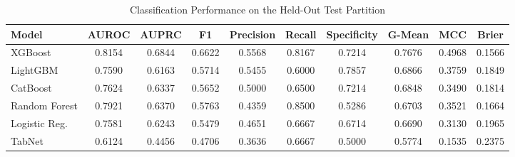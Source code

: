 \begin{table}
\centering
\caption{Classification Performance on the Held-Out Test Partition}
\label{tab:results}
\begin{tabular}{lccccccccc}
\toprule
Model & AUROC & AUPRC & F1 & Precision & Recall & Specificity & G-Mean & MCC & Brier \\
\midrule
XGBoost & 0.8154 & 0.6844 & 0.6622 & 0.5568 & 0.8167 & 0.7214 & 0.7676 & 0.4968 & 0.1566 \\
LightGBM & 0.7590 & 0.6163 & 0.5714 & 0.5455 & 0.6000 & 0.7857 & 0.6866 & 0.3759 & 0.1849 \\
CatBoost & 0.7624 & 0.6337 & 0.5652 & 0.5000 & 0.6500 & 0.7214 & 0.6848 & 0.3490 & 0.1814 \\
Random Forest & 0.7921 & 0.6370 & 0.5763 & 0.4359 & 0.8500 & 0.5286 & 0.6703 & 0.3521 & 0.1664 \\
Logistic Reg. & 0.7581 & 0.6243 & 0.5479 & 0.4651 & 0.6667 & 0.6714 & 0.6690 & 0.3130 & 0.1965 \\
TabNet & 0.6124 & 0.4456 & 0.4706 & 0.3636 & 0.6667 & 0.5000 & 0.5774 & 0.1535 & 0.2375 \\
\bottomrule
\end{tabular}
\end{table}
